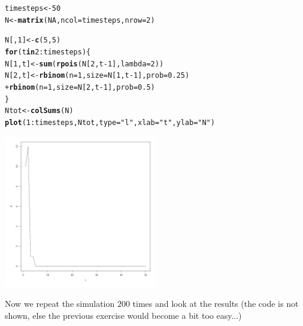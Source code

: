 \documentclass{article}\usepackage[]{graphicx}\usepackage[]{color}
\makeatletter
\newcommand{\hlnum}[1]{\textcolor[rgb]{0.686,0.059,0.569}{#1}}%
\newcommand{\hlstr}[1]{\textcolor[rgb]{0.192,0.494,0.8}{#1}}%
\newcommand{\hlopt}[1]{\textcolor[rgb]{0,0,0}{#1}}%
\newcommand{\hlstd}[1]{\textcolor[rgb]{0.345,0.345,0.345}{#1}}%
\newcommand{\hlkwa}[1]{\textcolor[rgb]{0.161,0.373,0.58}{\textbf{#1}}}%
\newcommand{\hlkwb}[1]{\textcolor[rgb]{0.69,0.353,0.396}{#1}}%
\newcommand{\hlkwc}[1]{\textcolor[rgb]{0.333,0.667,0.333}{#1}}%
\newcommand{\hlkwd}[1]{\textcolor[rgb]{0.737,0.353,0.396}{\textbf{#1}}}%
\newenvironment{kframe}{%
 \def\at@end@of@kframe{}%
 \ifinner\ifhmode%
  \def\at@end@of@kframe{\end{minipage}}%
  \begin{minipage}{\columnwidth}%
 \fi\fi%
 \def\FrameCommand##1{\hskip\@totalleftmargin \hskip-\fboxsep
 \colorbox{shadecolor}{##1}\hskip-\fboxsep
     \hskip-\linewidth \hskip-\@totalleftmargin \hskip\columnwidth}%
 \MakeFramed {\advance\hsize-\width
   \@totalleftmargin\z@ \linewidth\hsize
   \@setminipage}}%
 {\par\unskip\endMakeFramed%
 \at@end@of@kframe}
\newenvironment{knitrout}{}{} %
\makeatother
\begin{document}
\begin{knitrout}
\color{fgcolor}\begin{kframe}
\begin{alltt}
\hlstd{timesteps}\hlkwb{<-}\hlnum{50}
\hlstd{N}\hlkwb{<-}\hlkwd{matrix}\hlstd{(}\hlnum{NA}\hlstd{,}\hlkwc{ncol}\hlstd{=timesteps,}\hlkwc{nrow}\hlstd{=}\hlnum{2}\hlstd{)}

\hlstd{N[,}\hlnum{1}\hlstd{]}\hlkwb{<-}\hlkwd{c}\hlstd{(}\hlnum{5}\hlstd{,}\hlnum{5}\hlstd{)}
\hlkwa{for}\hlstd{(t} \hlkwa{in} \hlnum{2}\hlopt{:}\hlstd{timesteps)\{}
    \hlstd{N[}\hlnum{1}\hlstd{,t]}\hlkwb{<-}\hlkwd{sum}\hlstd{(}\hlkwd{rpois}\hlstd{(N[}\hlnum{2}\hlstd{,t}\hlopt{-}\hlnum{1}\hlstd{],}\hlkwc{lambda}\hlstd{=}\hlnum{2}\hlstd{))}
    \hlstd{N[}\hlnum{2}\hlstd{,t]}\hlkwb{<-}\hlkwd{rbinom}\hlstd{(}\hlkwc{n}\hlstd{=}\hlnum{1}\hlstd{,}\hlkwc{size}\hlstd{=N[}\hlnum{1}\hlstd{,t}\hlopt{-}\hlnum{1}\hlstd{],}\hlkwc{prob}\hlstd{=}\hlnum{0.25}\hlstd{)}
        \hlopt{+} \hlkwd{rbinom}\hlstd{(}\hlkwc{n}\hlstd{=}\hlnum{1}\hlstd{,}\hlkwc{size}\hlstd{=N[}\hlnum{2}\hlstd{,t}\hlopt{-}\hlnum{1}\hlstd{],}\hlkwc{prob}\hlstd{=}\hlnum{0.5}\hlstd{)}
\hlstd{\}}
\hlstd{Ntot}\hlkwb{<-}\hlkwd{colSums}\hlstd{(N)}
\hlkwd{plot}\hlstd{(}\hlnum{1}\hlopt{:}\hlstd{timesteps,Ntot,}\hlkwc{type}\hlstd{=}\hlstr{"l"}\hlstd{,}\hlkwc{xlab}\hlstd{=}\hlstr{"t"}\hlstd{,}\hlkwc{ylab}\hlstd{=}\hlstr{"N"}\hlstd{)}
\end{alltt}
\end{kframe}

{\centering \includegraphics[width=0.5\textwidth]{figure/dice9-1} 

}



\end{knitrout}
Now we repeat the simulation $200$ times and look at the results (the code is not shown, else the previous exercise would become a bit too easy...)
\end{document}
